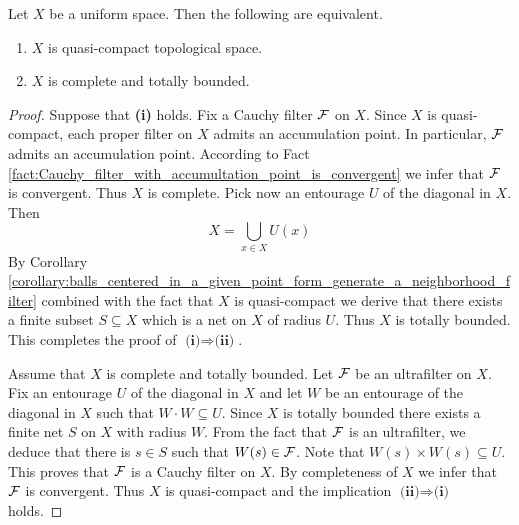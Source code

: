 \begin{theorem}\label{theorem:quasi_compact_uniform_spaces_are_equivalent_to_complete_and_totally_bounded}
	Let $X$ be a uniform space. Then the following are equivalent.
	\begin{enumerate}[label=\emph{\textbf{(\roman*)}}, leftmargin=3.0em]
		\item $X$ is quasi-compact topological space.
		\item $X$ is complete and totally bounded.
	\end{enumerate}
\end{theorem}
\begin{proof}
	Suppose that \textbf{(i)} holds. Fix a Cauchy filter ${\mathcal F}$ on $X$. Since $X$ is quasi-compact, each proper filter on $X$ admits an accumulation point. In particular, ${\mathcal F}$ admits an accumulation point. According to Fact \ref{fact:Cauchy_filter_with_accumultation_point_is_convergent} we infer that ${\mathcal F}$ is convergent. Thus $X$ is complete. Pick now an entourage $U$ of the diagonal in $X$. Then
	$$X = \bigcup_{x\in X}U(x)$$
	By Corollary \ref{corollary:balls_centered_in_a_given_point_form_generate_a_neighborhood_filter} combined with the fact that $X$ is quasi-compact we derive that there exists a finite subset $S \subseteq X$ which is a net on $X$ of radius $U$. Thus $X$ is totally bounded. This completes the proof of $\textbf{(i)}\Rightarrow \textbf{(ii)}$.

	Assume that $X$ is complete and totally bounded. Let ${\mathcal F}$ be an ultrafilter on $X$. Fix an entourage $U$ of the diagonal in $X$ and let $W$ be an entourage of the diagonal in $X$ such that $W\cdot W \subseteq U$. Since $X$ is totally bounded there exists a finite net $S$ on $X$ with radius $W$. From the fact that ${\mathcal F}$ is an ultrafilter, we deduce that there is $s \in S$ such that $W(s) \in {\mathcal F}$. Note that $W(s)\times W(s) \subseteq U$. This proves that ${\mathcal F}$ is a Cauchy filter on $X$. By completeness of $X$ we infer that ${\mathcal F}$ is convergent. Thus $X$ is quasi-compact and the implication $\textbf{(ii)}\Rightarrow \textbf{(i)}$ holds.
\end{proof}













\small





